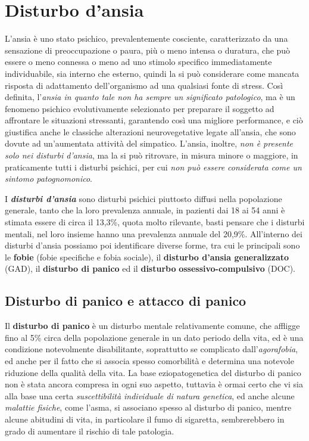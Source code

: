 \section{Disturbo d'ansia}

L'ansia è uno stato psichico, prevalentemente cosciente, caratterizzato
da una sensazione di preoccupazione o paura, più o meno intensa o
duratura, che può essere o meno connessa o meno ad uno stimolo specifico
immediatamente individuabile, sia interno che esterno, quindi la si può
considerare come mancata risposta di adattamento dell'organismo ad una
qualsiasi fonte di stress. Così definita, l'\emph{ansia in quanto tale
non ha sempre un significato patologico}, ma è un fenomeno psichico
evolutivamente selezionato per preparare il soggetto ad affrontare le
situazioni stressanti, garantendo così una migliore performance, e ciò
giustifica anche le classiche alterazioni neurovegetative legate
all'ansia, che sono dovute ad un'aumentata attività del simpatico.
L'ansia, inoltre, \emph{non è presente solo nei disturbi d'ansia}, ma la
si può ritrovare, in misura minore o maggiore, in praticamente tutti i
disturbi psichici, per cui \emph{non può essere considerata come un
sintomo patognomonico}.

I \textbf{\emph{disturbi d'ansia}} sono disturbi psichici piuttosto
diffusi nella popolazione generale, tanto che la loro prevalenza
annuale, in pazienti dai 18 ai 54 anni è stimata essere di circa il
13,3\%, quota molto rilevante, basti pensare che i disturbi mentali, nel
loro insieme hanno una prevalenza annuale del 20,9\%. All'interno dei
disturbi d'ansia possiamo poi identificare diverse forme, tra cui le
principali sono le \textbf{fobie} (fobie specifiche e fobia sociale), il
\textbf{disturbo d'ansia generalizzato} (GAD), il \textbf{disturbo di
panico} ed il \textbf{disturbo} \textbf{ossessivo-compulsivo} (DOC).

\subsection{Disturbo di panico e attacco di panico}

Il \textbf{disturbo di panico} è un disturbo mentale relativamente
comune, che affligge fino al 5\% circa della popolazione generale in un
dato periodo della vita, ed è una condizione notevolmente disabilitante,
soprattutto se complicato dall'\emph{agorafobia}, ed anche per il fatto
che si associa spesso comorbilità e determina una notevole riduzione
della qualità della vita. La base eziopatogenetica del disturbo di
panico non è stata ancora compresa in ogni suo aspetto, tuttavia è ormai
certo che vi sia alla base una certa \emph{suscettibilità individuale di
natura genetica}, ed anche alcune \emph{malattie fisiche}, come l'asma,
si associano spesso al disturbo di panico, mentre alcune abitudini di
vita, in particolare il fumo di sigaretta, sembrerebbero in grado di
aumentare il rischio di tale patologia.

